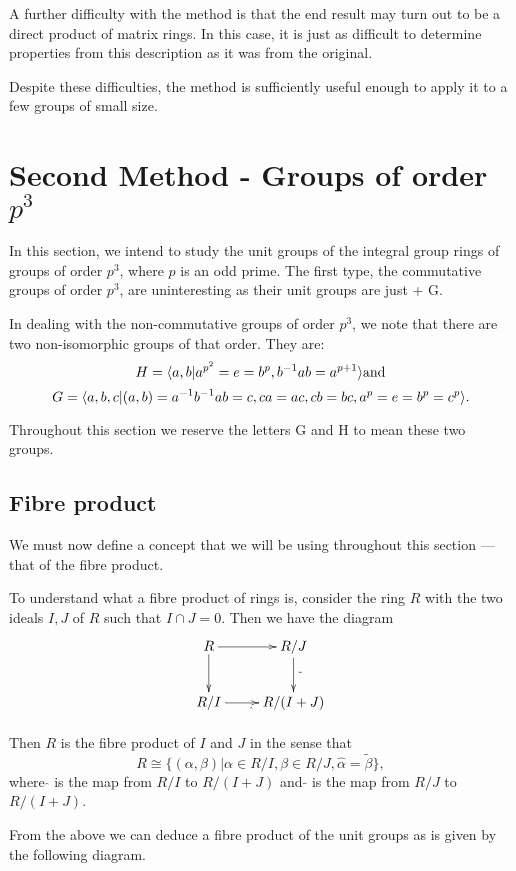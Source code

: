\documentclass[11pt]{report}
\begin{document}
A further difficulty with the method is that the end result may turn out to be a direct product of
matrix rings.  In this case, it is just as difficult to determine properties from this description as
it was from the original.

Despite these difficulties, the method is sufficiently useful enough to apply it to a few groups of
small size.

\section{Second Method - Groups of order $p^3$}

In this section, we intend to study the unit groups of the integral group rings of groups of order
\(p^3\), where $p$ is an odd prime.  The first type, the commutative groups of order \(p^3\), are uninteresting
as their unit groups are just + G.

In dealing with the non-commutative groups of order \(p^3\), we note that there are two non-isomorphic
groups of that order. They are:
\[H=\langle a,b \vert a^{p^2}=e=b^p, b^{-1}ab=a^{p+1} \rangle \mathrm{and}\]
\[G=\langle a,b,c \vert (a,b) = a^{-1}b^{-1}ab = c, ca=ac, cb=bc, a^p = e = b^p = c^p \rangle.\]

Throughout this section we reserve the letters G and H to mean these two groups.

\subsection{Fibre product}

We must now define a concept that we will be using throughout this section --- that of the fibre
product.

To understand what a fibre product of rings is, consider the ring $R$ with the two ideals $I,J$ of $R$
such that $I\cap{}J = 0$.  Then we have the diagram
\[
\xymatrix{
R \ar[r] \ar[d] &
   R/J \ar[d]^{\tilde{\ }} \\
R/I \ar[r]_{\hat{\ }} &
   R/(I+J)\\
}
\]

Then $R$ is the fibre product of $I$ and $J$ in the sense that
\[R\cong\{(\alpha,\beta)\vert \alpha{}\in{} R/I, \beta{}\in{} R/J, \hat{\alpha}=\tilde{\beta}\},\]
where $\hat{}$ is the map from $R/I$ to $R/(I+J)$ and $\tilde{}$ is the map from $R/J$ to $R/(I+J)$.

From the above we can deduce a fibre product of the unit groups as is given by the following diagram.
\end{document}
